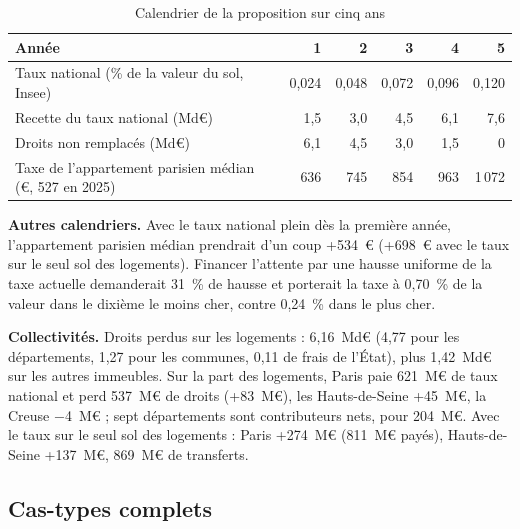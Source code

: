 \begin{table}[!htbp]\centering\scriptsize
\caption{Calendrier de la proposition sur cinq ans}\label{tab:fon_cal}
\begin{tabularx}{\linewidth}{@{}>{\raggedright\arraybackslash}X rrrrr@{}}
\toprule
Année & 1 & 2 & 3 & 4 & 5 \\
\midrule
Taux national (\% de la valeur du sol, Insee) & 0,024 & 0,048 & 0,072 & 0,096 & 0,120 \\
Recette du taux national (Md€) & 1,5 & 3,0 & 4,5 & 6,1 & 7,6 \\
Droits non remplacés (Md€) & 6,1 & 4,5 & 3,0 & 1,5 & 0 \\
Taxe de l'appartement parisien médian (€, 527 en 2025) & 636 & 745 & 854 & 963 & 1\,072 \\
\bottomrule
\end{tabularx}
\par\vspace{2pt}{\raggedright\scriptsize Droits divisés par deux dès l'annonce (année 0, non comptée) ; ventes et taxe
de 2025, euros de 2025. Déficit cumulé : 15,2~Md€ (12,4 avec la reprise des ventes) ; 7,6 (6,2) sur trois ans, 34,1
(27,8) sur dix. Montée retardée de trois ans : 30,3 / 37,9 / 56,8~Md€ (sur 3, 5 ou 10 ans) ; baisse des droits en deux
temps (un quart à l'annonce, un quart au démarrage), qui limite ce risque mais recrée l'attente : 18,9 / 26,5 /
45,5~Md€.\par}
\end{table}

\textbf{Autres calendriers.} Avec le taux national plein dès la première année, l'appartement parisien médian prendrait
d'un coup +534~€ (+698~€ avec le taux sur le seul sol des logements). Financer l'attente par une hausse uniforme de la
taxe actuelle demanderait 31~\% de hausse et porterait la taxe à 0,70~\% de la valeur dans le dixième le moins cher,
contre 0,24~\% dans le plus cher.

\textbf{Collectivités.} Droits perdus sur les logements : 6,16~Md€ (4,77 pour les départements, 1,27 pour les communes,
0,11 de frais de l'État), plus 1,42~Md€ sur les autres immeubles. Sur la part des logements, Paris paie 621~M€ de taux
national et perd 537~M€ de droits (+83~M€), les Hauts-de-Seine +45~M€, la Creuse $-$4~M€ ; sept départements sont
contributeurs nets, pour 204~M€. Avec le taux sur le seul sol des logements : Paris +274~M€ (811~M€ payés),
Hauts-de-Seine +137~M€, 869~M€ de transferts.

\subsection{Cas-types complets}

